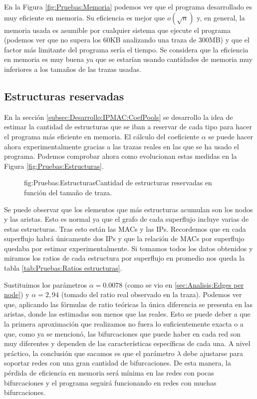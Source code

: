 \documentclass[tfg,epsbased,lof,lot,loa,covers,final,copyright,overleaf]{tfgtfmthesisuam}
\begin{document}
En la Figura \ref{fig:Pruebas:Memoria} podemos ver que el programa desarrollado es muy eficiente en memoria. Su eficiencia es mejor que $o(\sqrt{n})$ y, en general, la memoria usada es asumible por cualquier sistema que ejecute el programa (podemos ver que no supera los 60KB analizando una traza de 300MB) y que el factor más limitante del programa sería el tiempo. Se considera que la eficiencia en memoria es muy buena ya que se estarían usando cantidades de memoria muy inferiores a los tamaños de las trazas usadas. 

\subsection{Estructuras reservadas}
En la sección \ref{subsec:Desarrollo:IPMAC:CoefPools} se desarrollo la idea de estimar la cantidad de estructuras que se iban a reservar de cada tipo para hacer el programa más eficiente en memoria. El cálculo del coeficiente $\alpha$ se puede hacer ahora experimentalmente gracias a las trazas reales en las que se ha usado el programa. Podemos comprobar ahora como evolucionan estas medidas en la Figura \ref{fig:Pruebas:Estructuras}.


\begin{figure}[Gráfica de estructuras utilizadas]{fig:Pruebas:Estructuras}{Cantidad de estructuras reservadas en función del tamaño de traza.}
\end{figure}

Se puede observar que los elementos que más estructuras acumulan son los nodos y las aristas. Esto es normal ya que el grafo de cada superflujo incluye varias de estas estructuras. Tras esto están las MACs y las IPs. Recordemos que en cada superflujo habrá únicamente dos IPs y que la relación de MACs por superflujo quedaba por estimar experimentalmente. Si tomamos todos los datos obtenidos y miramos los ratios de cada estructura por superflujo en promedio nos queda la tabla \ref{tab:Pruebas:Ratios estructuras}.

Sustituimos los parámetros $\alpha = 0.0078$ (como se vio en \ref{sec:Analisis:Edges per node}) y $\alpha = 2,94$ (tomado del ratio real observado en la traza). Podemos ver que, aplicando las fórmulas de ratio teóricas la única diferencia se presenta en las aristas, donde las estimadas son menos que las reales. Esto se puede deber a que la primera aproximación que realizamos no fuera lo suficientemente exacta o a que, como ya se mencionó, las bifurcaciones que puede haber en cada red son muy diferentes y dependen de las características específicas de cada una. A nivel práctico, la conclusión que sacamos es que el parámetro $\lambda$ debe ajustarse para soportar redes con una gran cantidad de bifurcaciones. De esta manera, la pérdida de eficiencia en memoria será mínima en las redes con pocas bifurcaciones y el programa seguirá funcionando en redes con muchas bifurcaciones.
\end{document}
